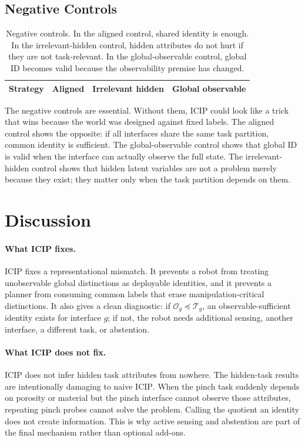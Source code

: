 \documentclass{article}
\newcommand{\icip}{\textsc{ICIP}}
\newcommand{\obs}{\mathcal{O}}
\newcommand{\task}{\mathcal{T}}
\begin{document}
\subsection{Negative Controls}

\begin{table}[t]
\centering
\caption{Negative controls. In the aligned control, shared identity is enough. In the irrelevant-hidden control, hidden attributes do not hurt if they are not task-relevant. In the global-observable control, global ID becomes valid because the observability premise has changed.}
\label{tab:controls}
\begin{tabular}{lrrr}
\toprule
Strategy & Aligned & Irrelevant hidden & Global observable \\
\midrule

\end{tabular}
\end{table}

The negative controls are essential.
Without them, \icip{} could look like a trick that wins because the world was designed against fixed labels.
The aligned control shows the opposite: if all interfaces share the same task partition, common identity is sufficient.
The global-observable control shows that global ID is valid when the interface can actually observe the full state.
The irrelevant-hidden control shows that hidden latent variables are not a problem merely because they exist; they matter only when the task partition depends on them.

\section{Discussion}

\paragraph{What \icip{} fixes.}
\icip{} fixes a representational mismatch.
It prevents a robot from treating unobservable global distinctions as deployable identities, and it prevents a planner from consuming common labels that erase manipulation-critical distinctions.
It also gives a clean diagnostic: if $\obs_g \preceq \task_g$, an observable-sufficient identity exists for interface $g$; if not, the robot needs additional sensing, another interface, a different task, or abstention.

\paragraph{What \icip{} does not fix.}
\icip{} does not infer hidden task attributes from nowhere.
The hidden-task results are intentionally damaging to naive \icip{}.
When the pinch task suddenly depends on porosity or material but the pinch interface cannot observe those attributes, repeating pinch probes cannot solve the problem.
Calling the quotient an identity does not create information.
This is why active sensing and abstention are part of the final mechanism rather than optional add-ons.
\end{document}
